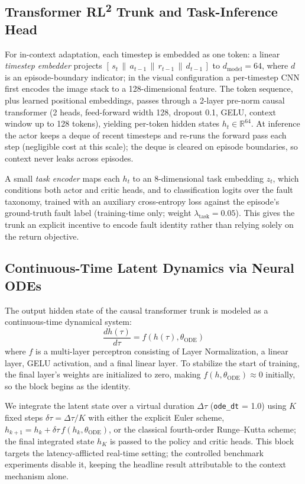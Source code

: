 \documentclass[conference]{IEEEtran}
\newcommand{\rltwo}{\texorpdfstring{RL\textsuperscript{2}}{RL2}}
\begin{document}
\subsection{Transformer \rltwo{} Trunk and Task-Inference Head}
\label{sec:trunk}
For in-context adaptation, each timestep is embedded as one token: a linear \emph{timestep embedder} projects $[\,s_t \,\|\, a_{t-1} \,\|\, r_{t-1} \,\|\, d_{t-1}\,]$ to $d_{\text{model}} = 64$, where $d$ is an episode-boundary indicator; in the visual configuration a per-timestep CNN first encodes the image stack to a 128-dimensional feature. The token sequence, plus learned positional embeddings, passes through a 2-layer pre-norm causal transformer (2 heads, feed-forward width 128, dropout 0.1, GELU, context window up to 128 tokens), yielding per-token hidden states $h_t \in \mathbb{R}^{64}$. At inference the actor keeps a deque of recent timesteps and re-runs the forward pass each step (negligible cost at this scale); the deque is cleared on episode boundaries, so context never leaks across episodes.

A small \emph{task encoder} maps each $h_t$ to an 8-dimensional task embedding $z_t$, which conditions both actor and critic heads, and to classification logits over the fault taxonomy, trained with an auxiliary cross-entropy loss against the episode's ground-truth fault label (training-time only; weight $\lambda_{\text{task}} = 0.05$). This gives the trunk an explicit incentive to encode fault identity rather than relying solely on the return objective.

\subsection{Continuous-Time Latent Dynamics via Neural ODEs}
\label{sec:node}
The output hidden state of the causal transformer trunk is modeled as a continuous-time dynamical system:
\begin{equation}
    \frac{dh(\tau)}{d\tau} = f(h(\tau), \theta_{\text{ODE}})
\end{equation}
where $f$ is a multi-layer perceptron consisting of Layer Normalization, a linear layer, GELU activation, and a final linear layer. To stabilize the start of training, the final layer's weights are initialized to zero, making $f(h, \theta_{\text{ODE}}) \approx 0$ initially, so the block begins as the identity.

We integrate the latent state over a virtual duration $\Delta\tau$ (\texttt{ode\_dt} = 1.0) using $K$ fixed steps $\delta\tau = \Delta\tau / K$ with either the explicit Euler scheme, $h_{k+1} = h_k + \delta\tau \, f(h_k, \theta_{\text{ODE}})$, or the classical fourth-order Runge--Kutta scheme; the final integrated state $h_K$ is passed to the policy and critic heads. This block targets the latency-afflicted real-time setting; the controlled benchmark experiments disable it, keeping the headline result attributable to the context mechanism alone.
\end{document}
